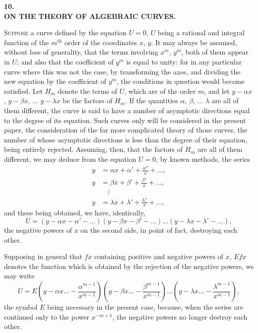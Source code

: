 \documentclass[11pt]{article}
\begin{document}
\begin{center}
\large\textbf{10.}\\[6pt]
\large\textbf{ON THE THEORY OF ALGEBRAIC CURVES.}
\end{center}


\medskip

\noindent\textsc{Suppose} a curve defined by the equation $U = 0$, $U$ being a rational and integral function of the $m^{\text{th}}$ order of the coordinates $x$, $y$. It may always be assumed, without loss of generality, that the terms involving $x^m$, $y^m$, both of them appear in $U$; and also that the coefficient of $y^m$ is equal to unity: for in any particular curve where this was not the case, by transforming the axes, and dividing the new equation by the coefficient of $y^m$, the conditions in question would become satisfied. Let $H_m$ denote the terms of $U$, which are of the order $m$, and let $y - \alpha x$, $y - \beta x$, $\ldots$ $y - \lambda x$ be the factors of $H_m$. If the quantities $\alpha$, $\beta$, $\ldots$ $\lambda$ are all of them different, the curve is said to have a number of asymptotic directions equal to the degree of its equation. Such curves only will be considered in the present paper, the consideration of the far more complicated theory of those curves, the number of whose asymptotic directions is less than the degree of their equation, being entirely rejected. Assuming, then, that the factors of $H_m$ are all of them different, we may deduce from the equation $U = 0$, by known methods, the series
\[
\begin{aligned}
y &= \alpha x + \alpha' + \frac{\alpha''}{x} + \ldots, \\
y &= \beta x + \beta' + \frac{\beta''}{x} + \ldots, \\
&\quad\vdots \\
y &= \lambda x + \lambda' + \frac{\lambda''}{x} + \ldots,
\end{aligned}
\tag{1}
\]
and these being obtained, we have, identically,
\[
U = (y - \alpha x - \alpha' - \ldots)(y - \beta x - \beta' - \ldots) \ldots (y - \lambda x - \lambda' - \ldots) \tag{2},
\]
the negative powers of $x$ on the second side, in point of fact, destroying each other.

Supposing in general that $f x$ containing positive and negative powers of $x$, $E f x$ denotes the function which is obtained by the rejection of the negative powers, we may write
\[
U = E\!\left(y - \alpha x \ldots - \frac{\alpha^{m-1}}{x^{m-1}}\right)\!\left(y - \beta x \ldots - \frac{\beta^{m-1}}{x^{m-1}}\right) \ldots \left(y - \lambda x \ldots - \frac{\lambda^{m-1}}{x^{m-1}}\right) \tag{3},
\]
the symbol $E$ being necessary in the present case, because, when the series are continued only to the power $x^{-m+1}$, the negative powers no longer destroy each other.
\end{document}
